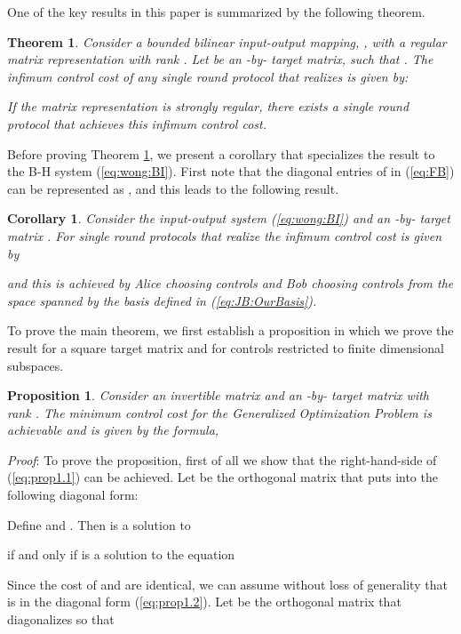\documentclass[12pt,onecolumn,draftcls]{IEEEtran}
\newtheorem{theorem}{Theorem}[section]
\newtheorem{corollary}{Corollary}[section]
\newtheorem{proposition}{Proposition}[section]
\begin{document}
One of the key results in this paper is summarized by the following theorem.

\begin{theorem}
\label{thm:1}
Consider a bounded bilinear input-output mapping, , with a regular matrix representation  with rank .
Let  be an -by- target matrix, such that
. 
The infimum control cost of any single round protocol that realizes  is given by:

If the matrix representation is strongly regular, there exists a single round protocol that achieves this infimum control cost.
\end{theorem}

Before proving Theorem \ref{thm:1}, we present a  corollary that specializes the result to the B-H system (\ref{eq:wong:BI}). 
First note that the diagonal entries of  in (\ref{eq:FB}) can be represented as , and this leads to the following result.

\begin{corollary}
\label{cor:1}
Consider the input-output system (\ref{eq:wong:BI}) and an -by- target matrix .
For single round protocols that realize  the infimum control cost is given by

and this is achieved by Alice choosing  controls and Bob choosing  controls
from  the space spanned by the basis  defined in (\ref{eq:JB:OurBasis}).
\end{corollary}

To prove the main theorem, we first establish a proposition in which we prove the result for
a square target matrix  and for controls restricted to finite dimensional subspaces.

\begin{proposition}
\label{prop:1}
Consider an invertible matrix  and an -by- target matrix  with rank .
The minimum control cost for the Generalized Optimization Problem 
is achievable and is given by the formula,

\end{proposition}

\noindent
\textit{Proof}:
To prove the proposition, first of all we show that the right-hand-side of (\ref{eq:prop1.1}) can be achieved.
Let  be the orthogonal matrix that puts  into the following diagonal form:

Define  and .
Then  is a solution to

if and only if 
is a solution to the equation

Since the cost of  and  are identical, we can assume
without loss of generality that  is in the diagonal form (\ref{eq:prop1.2}).
Let  be the orthogonal matrix that diagonalizes  so that
\end{document}
